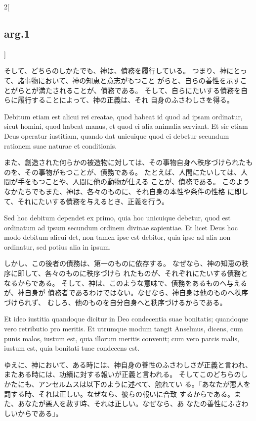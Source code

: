 \documentclass[paper=a4paper,fontsize=10pt,jafontsize=9pt,titlepage]{jlreq}
\begin{document}
\begin{paracol}{2}[\subsection{arg.1}]
\switchcolumn

そして、どちらのしかたでも、神は、債務を履行している。
つまり、神にとって、諸事物において、神の知恵と意志がもつこと
 がらと、自らの善性を示すことがらとが満たされることが、債務である。
 そして、自らにたいする債務を自らに履行することによって、神の正義は、それ
 自身のふさわしさを得る。

\switchcolumn*

Debitum etiam est alicui rei creatae,
quod habeat id quod ad ipsam ordinatur, sicut homini, quod habeat manus,
et quod ei alia animalia serviant. 
Et sic etiam Deus operatur iustitiam,
quando dat unicuique quod ei debetur secundum rationem suae naturae et
conditionis.

\switchcolumn

また、創造された何らかの被造物に対しては、その事物自身へ秩序づけられたも
 のを、その事物がもつことが、債務である。
たとえば、人間にたいしては、人間が手をもつことや、人間に他の動物が仕える
 ことが、債務である。
このようなかたちでもまた、神は、各々のものに、それ自身の本性や条件の性格
 に即して、それにたいする債務を与えるとき、正義を行う。

\switchcolumn*

Sed hoc debitum dependet ex primo, quia hoc unicuique
debetur, quod est ordinatum ad ipsum secundum ordinem divinae
sapientiae. Et licet Deus hoc modo debitum alicui det, non tamen ipse
est debitor, quia ipse ad alia non ordinatur, sed potius alia in
ipsum.

\switchcolumn

しかし、この後者の債務は、第一のものに依存する。
なぜなら、神の知恵の秩序に即して、各々のものに秩序づけら
 れたものが、それぞれにたいする債務となるからである。
そして、神は、このような意味で、債務をあるものへ与えるが、神自身が
債務者であるわけではない。なぜなら、神自身は他のものへ秩序づけられず、
 むしろ、他のものを自分自身へと秩序づけるからである。

\switchcolumn*

Et ideo iustitia quandoque dicitur in Deo condecentia suae
bonitatis; quandoque vero retributio pro meritis. Et utrumque modum
tangit Anselmus, dicens, cum punis malos, iustum est, quia illorum
meritis convenit; cum vero parcis malis, iustum est, quia bonitati tuae
condecens est.

\switchcolumn

ゆえに、神において、ある時には、神自身の善性のふさわしさが正義と言われ、
 またある時には、功績に対する報いが正義と言われる。
そしてこのどちらのしかたにも、アンセルムスは以下のように述べて、触れてい
 る。「あなたが悪人を罰する時、それは正しい。なぜなら、彼らの報いに合致
 するからである。また、あなたが悪人を赦す時、それは正しい。なぜなら、あ
 なたの善性にふさわしいからである」。


\end{paracol}
\end{document}
